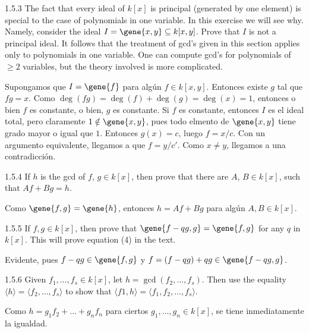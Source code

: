 \documentclass[twoside]{article}
\begin{document}
\begin{ejercicio}{1.5.3}
The fact that every ideal of $k[x]$ is principal (generated by one element) is special to the case of polynomials in one variable.
In this exercise we will see why.
Namely, consider the ideal $I=\gene{x,y} \subseteq k[x,y]$.
Prove that $I$ is not a principal ideal.
It follows that the treatment of gcd’s given in this section applies only to polynomials in one variable.
One can compute gcd’s for polynomials of $≥ 2$ variables, but the theory involved is more complicated.
\end{ejercicio}
\begin{solucion}
Supongamos que $I = \gene{f}$ para algún $f \in k[x,y]$.
Entonces existe $g$ tal que $fg = x$.
Como $\deg(fg) = \deg(f) + \deg(g) = \deg(x) = 1$, entonces o bien $f$ es constante, o bien, $g$ es constante.
Si $f$ es constante, entonces $I$ es el ideal total, pero claramente $1 \notin \gene{x,y}$, pues todo elmento de $\gene{x,y}$ tiene grado mayor o igual que $1$.
Entonces $g(x) = c$, luego $f = x/c$.
Con un argumento equivalente, llegamos a que $f = y/c'$.
Como $x \neq y$, llegamos a una contradicción.
\end{solucion}

\newpage

\begin{ejercicio}{1.5.4}
If $h$ is the gcd of $f$, $g \in k[x]$, then prove that there are $A$, $B \in k[x]$, such that $A f + B g = h$.
\end{ejercicio}
\begin{solucion}
Como $\gene{f,g} = \gene{h}$, entonces $h = A f + B g$ para algún $A, B \in k[x]$.
\end{solucion}

\newpage

\begin{ejercicio}{1.5.5}
If $f,g \in k[x]$, then prove that $\gene{f-qg,g} = \gene{f,g}$ for any $q$ in $k[x]$.
This will prove equation (4) in the text.
\end{ejercicio}
\begin{solucion}
Evidente, pues $f-qg \in \gene{f,g}$ y $f = (f-qg)+qg \in \gene{f-qg,g}$.
\end{solucion}

\newpage

\begin{ejercicio}{1.5.6}
Given $f_1,\dots , f_s ∈ k[x]$, let $h = \gcd( f_2,\dots , f_s)$. Then use the equality 
$\langle h\rangle = 
 \langle f_2,\dots , f_s\rangle$
to show that 
 $\langle f1, h\rangle = 
 \langle f_1, f_2,\dots, f_s\rangle$.
\end{ejercicio}
\begin{solucion}
Como $h=g_1f_2+\dots+g_nf_n$ para ciertos $g_1,\dots, g_n\in k[x]$, se tiene inmediatamente la igualdad. 
\end{solucion}
\end{document}
